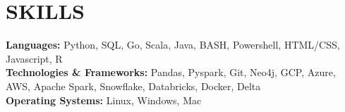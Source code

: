 \documentclass[letterpaper,11pt]{article}
\begin{document}
\section{\textbf{SKILLS}}
    \begin{itemize}[leftmargin=0.05in, label={}]
        \small{\item{
        \textbf{Languages: }{Python, SQL, Go, Scala, Java, BASH, Powershell, HTML/CSS, Javascript, R} \\
        \textbf{Technologies \& Frameworks: }{Pandas, Pyspark, Git, Neo4j, GCP, Azure, AWS, Apache Spark, Snowflake, Databricks, Docker, Delta} \\
        \textbf{Operating Systems: }{Linux, Windows, Mac } \\
        }}
    \end{itemize}


\end{document}
